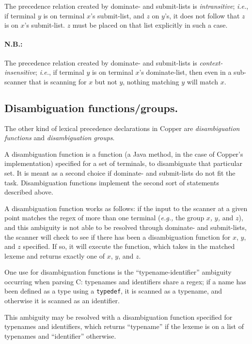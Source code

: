 \documentclass[12pt,english,twoside]{report}
\begin{document}
The precedence relation created by dominate- and submit-lists is \emph{intransitive};
\emph{i.e.}, if terminal $y$ is on terminal $x$'s submit-list, and
$z$ on $y$'s, it does not follow that $z$ is on $x$'s submit-list.
$z$ must be placed on that list explicitly in such a case.


\paragraph{N.B.:}

The precedence relation created by dominate- and submit-lists is \emph{context-insensitive};
\emph{i.e.}, if terminal $y$ is on terminal $x$'s dominate-list,
then even in a sub-scanner that is scanning for $x$ but not $y$,
nothing matching $y$ will match $x$.


\subsection{Disambiguation functions/groups.}

The other kind of lexical precedence declarations in Copper are \emph{disambiguation
functions} and \emph{disambiguation groups}.

A disambiguation function is a function (a Java method, in the case
of Copper's implementation) specified for a set of terminals, to disambiguate
that particular set. It is meant as a second choice if dominate- and
submit-lists do not fit the task. Disambiguation functions implement
the second sort of statements described above.

A disambiguation function works as follows: if the input to the scanner
at a given point matches the regex of more than one terminal (\emph{e.g.,}
the group \emph{}$x$\emph{,} $y$\emph{,} and \emph{}$z$), and this
ambiguity is not able to be resolved through dominate- and submit-lists,
the scanner will check to see if there has been a disambiguation function
for $x$, $y$, and $z$ specified. If so, it will execute the function,
which takes in the matched lexeme and returns exactly one of $x$,
$y$, and $z$.

One use for disambiguation functions is the {}``typename-identifier''
ambiguity occurring when parsing C: typenames and identifiers share
a regex; if a name has been defined as a type using a \texttt{typedef},
it is scanned as a typename, and otherwise it is scanned as an identifier.

This ambiguity may be resolved with a disambiguation function specified
for typenames and identifiers, which returns {}``typename'' if the
lexeme is on a list of typenames and {}``identifier'' otherwise.
\end{document}
